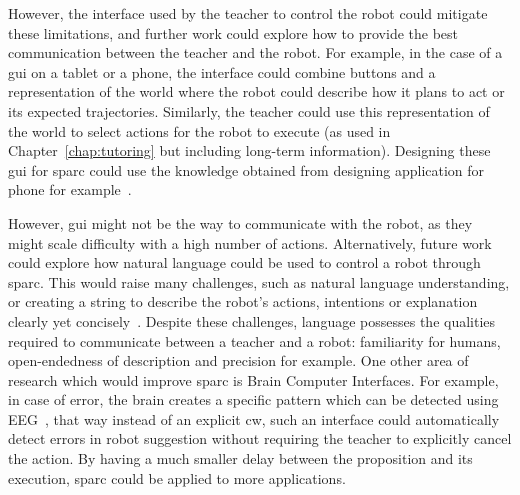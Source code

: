 However, the interface used by the teacher to control the robot could mitigate these limitations, and further work could explore how to provide the best communication between the teacher and the robot. For example, in the case of a \gls{gui} on a tablet or a phone, the interface could combine buttons and a representation of the world where the robot could describe how it plans to act or its expected trajectories. Similarly, the teacher could use this representation of the world to select actions for the robot to execute (as used in Chapter~\ref{chap:tutoring} but including long-term information). Designing these \gls{gui} for \gls{sparc} could use the knowledge obtained from designing application for phone for example~\citep{joorabchi2013real}. 

However, \gls{gui} might not be the way to communicate with the robot, as they might scale difficulty with a high number of actions. Alternatively, future work could explore how natural language could be used to control a robot through \gls{sparc}. This would raise many challenges, such as natural language understanding, or creating a string to describe the robot's actions, intentions or explanation clearly yet concisely~\citep{hayes2017improving}. Despite these challenges, language possesses the qualities required to communicate between a teacher and a robot: familiarity for humans, open-endedness of description and precision for example. One other area of research which would improve \gls{sparc} is Brain Computer Interfaces. For example, in case of error, the brain creates a specific pattern which can be detected using EEG~\citep{gehring1993neural}, that way instead of an explicit \gls{cw}, such an interface could automatically detect errors in robot suggestion without requiring the teacher to explicitly cancel the action. By having a much smaller delay between the proposition and its execution, \gls{sparc} could be applied to more applications.

